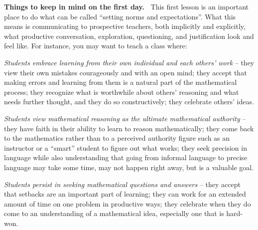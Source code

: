 \documentclass[11pt]{article}
\newenvironment{bignote}[1][Instructor note]%
	{\begin{mdframed}\raggedright{\bf #1.~}}
	{\end{mdframed}}
\theoremstyle{definition}
\begin{document}
\begin{bignote}[Things to keep in mind on the first day]
This first lesson is an important place to do what can be called ``setting norms and expectations''. What this means is communicating to prospective teachers, both implicitly and explicitly, what productive conversation, exploration, questioning, and justification look and feel like. For instance, you may want to teach a class where:
	\begin{itemize*}
	\item {\it Students embrace learning from their own individual and each others' work} -- they view their own mistakes courageously and with an open mind; they accept that making errors and learning from them is a natural part of the mathematical process; they  recognize what is worthwhile about others' reasoning and what needs further thought, and they do so constructively; they celebrate others' ideas. 
	\item {\it Students view mathematical reasoning as the ultimate mathematical authority} -- they have faith in their ability to learn to reason mathematically; they come back to the mathematics rather than to a perceived authority figure such as an instructor or a ``smart'' student to figure out what works; they seek precision in language while also understanding that going from informal language to precise language may take some time, may not happen right away, but is a valuable goal.
	\item {\it Students persist in seeking mathematical questions and answers} -- they accept that setbacks are an important part of learning; they can work for an extended amount of time on one problem in productive ways; they celebrate when they do come to an understanding of a mathematical idea, especially one that is hard-won.
	\end{itemize*}


\end{bignote}
\end{document}
